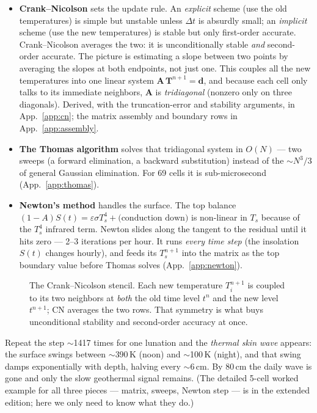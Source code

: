 \documentclass[11pt]{report}
\begin{document}
\begin{itemize}[leftmargin=1.4em,itemsep=3pt]
\item \textbf{Crank--Nicolson} sets the update rule. An \emph{explicit} scheme
  (use the old temperatures) is simple but unstable unless $\Delta t$ is
  absurdly small; an \emph{implicit} scheme (use the new temperatures) is stable
  but only first-order accurate. Crank--Nicolson averages the two: it is
  unconditionally stable \emph{and} second-order accurate. The picture is
  estimating a slope between two points by averaging the slopes at both
  endpoints, not just one. This couples all the new temperatures into one linear
  system $\mathbf{A}\,\mathbf{T}^{n+1}=\mathbf{d}$, and because each cell only
  talks to its immediate neighbors, $\mathbf{A}$ is \emph{tridiagonal} (nonzero
  only on three diagonals). Derived, with the truncation-error and stability
  arguments, in App.~\ref{app:cn}; the matrix assembly and boundary rows in
  App.~\ref{app:assembly}.
\item \textbf{The Thomas algorithm} solves that tridiagonal system in $O(N)$
  --- two sweeps (a forward elimination, a backward substitution) instead of the
  $\sim N^3/3$ of general Gaussian elimination. For 69 cells it is
  sub-microsecond (App.~\ref{app:thomas}).
\item \textbf{Newton's method} handles the surface. The top balance
  $(1-A)S(t)=\varepsilon\sigma T_s^4 + \text{(conduction down)}$ is non-linear in
  $T_s$ because of the $T_s^4$ infrared term. Newton slides along the tangent to
  the residual until it hits zero --- 2--3 iterations per hour. It runs
  \emph{every time step} (the insolation $S(t)$ changes hourly), and feeds its
  $T_s^{n+1}$ into the matrix as the top boundary value before Thomas solves
  (App.~\ref{app:newton}).
\end{itemize}

\begin{figure}[htbp]\centering

\caption{The Crank--Nicolson stencil. Each new temperature $T_i^{n+1}$ is coupled
to its two neighbors at \emph{both} the old time level $t^n$ and the new level
$t^{n+1}$; CN averages the two rows. That symmetry is what buys unconditional
stability and second-order accuracy at once.}
\label{fig:cnstencil}
\end{figure}

\noindent Repeat the step $\sim$1417 times for one lunation and the \emph{thermal
skin wave} appears: the surface swings between $\sim$390\,K (noon) and
$\sim$100\,K (night), and that swing damps exponentially with depth, halving
every $\sim$6\,cm. By 80\,cm the daily wave is gone and only the slow geothermal
signal remains. (The detailed 5-cell worked example for all three pieces ---
matrix, sweeps, Newton step --- is in the extended edition; here we only need to
know what they do.)
\end{document}

